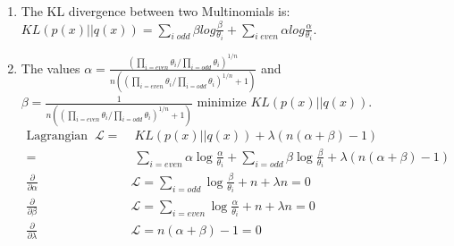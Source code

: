 \begin{enumerate}
\begin{enumerate}
\item The KL divergence between two Multinomials is: $KL(p(x)||q(x))=\sum_{i\; odd}\beta log\frac{\beta}{\theta_{i}}+\sum_{i\; even}\alpha log\frac{\alpha}{\theta_{i}}$.
\item The values $\alpha=\frac{(\prod_{i=even}\theta_{i}/\prod_{i=odd}\theta_{i})^{1/n}}{n((\prod_{i=even}\theta_{i}/\prod_{i=odd}\theta_{i})^{1/n}+1)}$
and $\beta=\frac{1}{n((\prod_{i=even}\theta_{i}/\prod_{i=odd}\theta_{i})^{1/n}+1)}$
minimize $KL(p(x)||q(x))$. \begin{align*}
\textrm{Lagrangian}\;\;\mathcal{L}= & \; KL(p(x)||q(x))+\lambda(n(\alpha+\beta)-1)\\
= & \;\sum_{i=even}\alpha\log\frac{\alpha}{\theta_{i}}+\sum_{i=odd}\beta\log\frac{\beta}{\theta_{i}}+\lambda(n(\alpha+\beta)-1)\\
\frac{\partial}{\partial\alpha} & \mathcal{L}=\sum_{i=odd}\log\frac{\beta}{\theta_{i}}+n+\lambda n=0\\
\frac{\partial}{\partial\beta} & \mathcal{L}=\sum_{i=even}\log\frac{\alpha}{\theta_{i}}+n+\lambda n=0\\
\frac{\partial}{\partial\lambda} & \mathcal{L}=n(\alpha+\beta)-1=0\end{align*}
 
\end{enumerate}
\end{enumerate}
